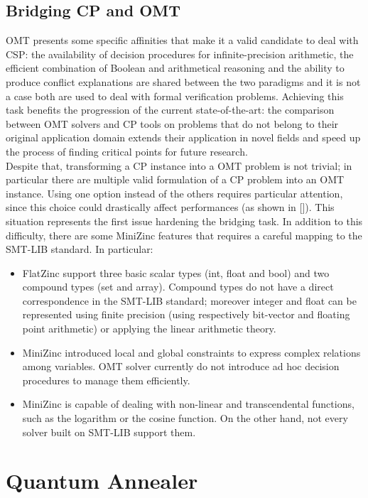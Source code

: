 \subsection{Bridging CP and OMT}

OMT presents some specific affinities that make it a valid candidate to deal with CSP: the availability of decision procedures for infinite-precision arithmetic, the efficient combination of
Boolean and arithmetical reasoning and the ability to produce conflict explanations are shared between the two paradigms and it is not a case both are used to deal with formal verification problems. Achieving this task benefits the progression of the current state-of-the-art: the comparison between OMT solvers and CP tools on problems that do not belong to their original application domain extends their application in novel fields and speed up the process of finding critical points for future research. \\ 
Despite that, transforming a CP instance into a OMT problem is not trivial; in particular there are multiple valid formulation of a CP problem into an OMT instance. Using one option instead of the others requires particular attention, since this choice could drastically affect performances (as shown in []). This situation represents the first issue hardening the bridging task. In addition to this difficulty, there are some MiniZinc features that requires a careful mapping to the SMT-LIB standard. In particular:

\begin{itemize}
    \item FlatZinc support three basic scalar types (int, float and bool) and two compound types (set and array). Compound types do not have a direct correspondence in the SMT-LIB standard; moreover integer and float can be represented using finite precision (using respectively bit-vector and floating point arithmetic) or applying the linear arithmetic theory.
    \item MiniZinc introduced local and global constraints to express complex relations among variables. OMT solver currently do not introduce ad hoc decision procedures to manage them efficiently.
    \item MiniZinc is capable of dealing with non-linear and transcendental functions, such as the logarithm or the cosine function. On the other hand, not every solver built on SMT-LIB support them.
\end{itemize}

\section{Quantum Annealer}
\label{sec:quantum}


